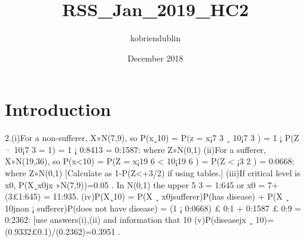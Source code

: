 \documentclass{article}
\title{RSS_Jan_2019_HC2}
\author{kobriendublin }
\date{December 2018}
\begin{document}
\maketitle

\section{Introduction}

2.(i)For a non-sufferer, X»N(7,9), so
P(x¸10) = P(z = x¡7
3 ¸ 10¡7
3 )
= 1 ¡ P(Z · 10¡7
3 = 1)
= 1 ¡ 0:8413
= 0:1587:
where Z»N(0,1)
(ii)For a sufferer, X»N(19,36), so
P(x<10) = P(Z = x¡19
6 < 10¡19
6 )
= P(Z < ¡3
2 ) = 0:0668:
where Z»N(0,1)
[Calculate as 1-P(Z<+3/2) if using tables.]
(iii)If critical level is x0, P(X¸x0jx »N(7,9))=0.05 .
In N(0,1) the upper 5%
3 = 1:645 or x0 = 7+(3£1:645) =
11:935.
(iv)P(X¸10) = P(X ¸ x0jsufferer)P(has disease) + P(X ¸ 10jnon ¡ sufferer)P(does not have disease)
= (1 ¡ 0:0668) £ 0:1 + 0:1587 £ 0:9
= 0:2362:
[use answers(i),(ii) and information that 10%
(v)P(diseasejx ¸ 10)=(0.9332£0.1)/(0.2362)=0.3951 .
\end{document}
